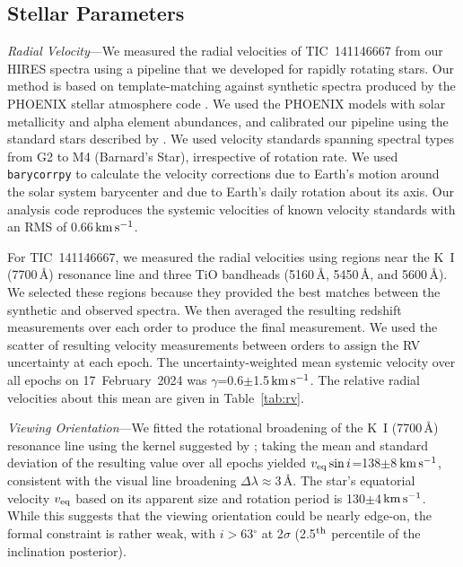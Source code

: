 \documentclass{nature3}
\newcommand{\kms}{\ensuremath{\rm km\,s^{-1}}}
\begin{document}
\begin{methods}
\subsection{Stellar Parameters}\phantom{+}
\label{subsec:stparams}

{\it Radial Velocity}---We measured the radial velocities of
TIC~141146667 from our HIRES spectra using a pipeline that we
developed for rapidly rotating stars.  Our method is based on
template-matching against synthetic spectra produced by the PHOENIX
stellar atmosphere code \cite{Husser2013}.  We used the PHOENIX models
with solar metallicity and alpha element abundances, and calibrated
our pipeline using the standard stars described by \cite{Chubak2012}.
We used velocity standards spanning spectral types from G2 to M4
(Barnard's Star), irrespective of rotation rate.  We used
\texttt{barycorrpy} \cite{Kanodia2018} to calculate the velocity
corrections due to Earth's motion around the solar system barycenter
and due to Earth's daily rotation about its axis.  Our analysis code
reproduces the systemic velocities of known velocity standards
\cite{Chubak2012} with an RMS of 0.66\,\kms.

For TIC~141146667, we measured the radial velocities using regions
near the K~I (7700\,\AA) resonance line and three TiO bandheads
(5160\,\AA, 5450\,\AA, and 5600\,\AA).  We selected these regions
because they provided the best matches between the synthetic and
observed spectra.  We then averaged the resulting redshift
measurements over each order to produce the final measurement.  We
used the scatter of resulting velocity measurements between orders to
assign the RV uncertainty at each epoch.  The uncertainty-weighted
mean systemic velocity over all epochs on 17~February~2024 was
$\gamma$=0.6$\pm$1.5\,\kms.  The relative radial velocities about this
mean are given in Table~\ref{tab:rv}.

{\it Viewing Orientation}---We fitted the rotational broadening of the
K~I (7700\,\AA) resonance line using the kernel suggested by
\cite{Gray2008}; taking the mean and standard deviation of the
resulting value over all epochs yielded $v_{\rm eq} \sin
i$=138$\pm$8\,\kms, consistent with the visual line broadening $\Delta
\lambda$$\approx$3\,\AA.  The star's equatorial velocity $v_{\rm eq}$
based on its apparent size and rotation period is 130$\pm$4\,\kms.
While this suggests that the viewing orientation could be nearly
edge-on, the formal constraint is rather weak, with $i$$>$63$^\circ$
at 2$\sigma$ (2.5$^{\rm th}$ percentile of the inclination posterior).


\end{methods}
\end{document}
